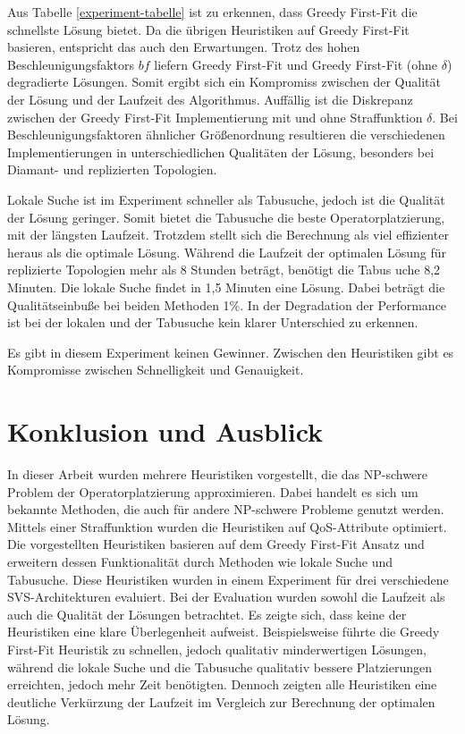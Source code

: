 \documentclass{article}
\begin{document}
Aus Tabelle \ref{experiment-tabelle} ist zu erkennen, dass Greedy First-Fit die schnellste Lösung bietet. 
Da die übrigen Heuristiken auf Greedy First-Fit basieren, entspricht das auch den Erwartungen. 
Trotz des hohen Beschleunigungsfaktors $bf$ liefern Greedy First-Fit und Greedy First-Fit (ohne $\delta$) degradierte Lösungen. 
Somit ergibt sich ein Kompromiss zwischen der Qualität der Lösung und der Laufzeit des Algorithmus. 
Auffällig ist die Diskrepanz zwischen der Greedy First-Fit Implementierung mit und ohne Straffunktion $\delta$. 
Bei Beschleunigungsfaktoren ähnlicher Größenordnung resultieren die verschiedenen Implementierungen 
in unterschiedlichen Qualitäten der Lösung, besonders bei Diamant- und replizierten Topologien.

Lokale Suche ist im Experiment schneller als Tabusuche, jedoch ist die Qualität der Lösung geringer. 
Somit bietet die Tabusuche die beste Operatorplatzierung, mit der längsten Laufzeit. 
Trotzdem stellt sich die Berechnung als viel effizienter heraus als die optimale Lösung. 
Während die Laufzeit der optimalen Lösung für replizierte Topologien mehr als 8 Stunden beträgt, benötigt die Tabus
uche 8,2 Minuten. 
Die lokale Suche findet in 1,5 Minuten eine Lösung. Dabei beträgt die Qualitätseinbuße bei beiden Methoden 1\%. 
In der Degradation der Performance ist bei der lokalen und der Tabusuche kein klarer Unterschied zu erkennen. 

Es gibt in diesem Experiment keinen Gewinner. Zwischen den Heuristiken gibt es Kompromisse zwischen Schnelligkeit und Genauigkeit. 

\section{Konklusion und Ausblick}In dieser Arbeit wurden mehrere Heuristiken vorgestellt, die das NP-schwere Problem der Operatorplatzierung approximieren.
Dabei handelt es sich um bekannte Methoden, die auch für andere NP-schwere Probleme genutzt werden. 
Mittels einer Straffunktion wurden die Heuristiken auf QoS-Attribute optimiert.\\
Die vorgestellten Heuristiken basieren auf dem Greedy First-Fit Ansatz und erweitern dessen Funktionalität durch Methoden wie lokale Suche und Tabusuche. 
Diese Heuristiken wurden in einem Experiment für drei verschiedene SVS-Architekturen evaluiert. 
Bei der Evaluation wurden sowohl die Laufzeit als auch die Qualität der Lösungen betrachtet. 
Es zeigte sich, dass keine der Heuristiken eine klare Überlegenheit aufweist. 
Beispielsweise führte die Greedy First-Fit Heuristik zu schnellen, jedoch qualitativ minderwertigen Lösungen, 
während die lokale Suche und die Tabusuche qualitativ bessere Platzierungen erreichten, jedoch mehr Zeit benötigten. 
Dennoch zeigten alle Heuristiken eine deutliche Verkürzung der Laufzeit im Vergleich zur Berechnung der optimalen Lösung.\\\\
\end{document}
